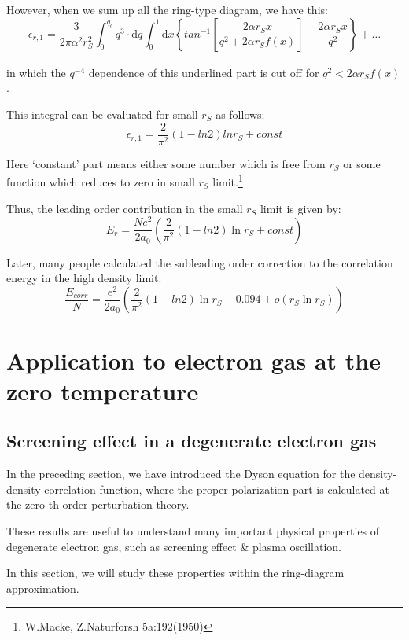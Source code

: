 However, when we sum up all the ring-type diagram, we have this:
\[ \epsilon_{r,1} = \frac{3}{2\pi \alpha^2 r_S^2}\int_0^{q_c} q^3 \cdot \mathrm{d} q \int_0^1 \mathrm{d} x \underline{\left\{ tan^{-1}\left[ \frac{2\alpha r_S x}{q^2 + 2\alpha r_S f(x)} \right] -\frac{2\alpha r_S x}{q^2} \right\}} + \ldots \]

in which the $q^{-4}$ dependence of this underlined part is cut off for $q^2 < 2 \alpha r_S f(x)$.

This integral can be evaluated for small $r_S$ as follows:
\begin{equation} \label{Eqs2.8.42}
\epsilon_{r,1} = \frac{2}{\pi^2}(1-ln 2)ln r_S + const
\end{equation}

Here `constant' part means either some number which is free from $r_S$ or some function which reduces to zero in small $r_S$ limit.\footnote{W.Macke, Z.Naturforsh 5a:192(1950)}

Thus, the leading order contribution in the small $r_S$ limit is given by:
\[E_r = \frac{N e^2}{2 a_0} \left( \frac{2}{\pi^2} (1-ln 2) \ln r_S + const \right)\]

Later, many people calculated the subleading order correction to the correlation energy in the high density limit:
\begin{equation} \label{Eqs2.8.43}
\frac{E_{corr}}{N} = \frac{e^2}{2 a_0} \left( \frac{2}{\pi^2}(1 -ln 2) \ln r_S - 0.094 + o(r_S \ln r_S) \right)
\end{equation}

\chapter{Application to electron gas at the zero temperature}%

\section{Screening effect in a degenerate electron gas}\label{s3-1}

In the preceding section, we have introduced the Dyson equation for the density-density correlation function, where the proper polarization part is calculated at the zero-th order perturbation theory.

These results are useful to understand many important physical properties of degenerate electron gas, such as screening effect \& plasma oscillation.

In this section, we will study these properties within the ring-diagram approximation.

